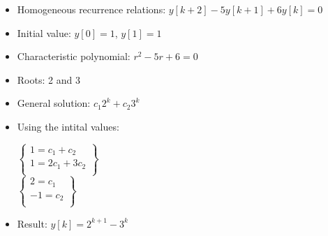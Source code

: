 \begin{frame}
	\begin{example}
		
		\begin{itemize}
			\item Homogeneous recurrence relations: $y[k+2]-5y[k+1]+6y[k] = 0$
			\item Initial value: $y[0] =1$, $y[1] = 1$
			\item Characteristic polynomial: $r^2-5r+6=0$
			\item Roots: 2 and 3
			\item General solution: $c_1 2^k + c_2 3^k$
			\item Using the intital values: 
			\begin{center}
				$
				\begin{Bmatrix}
					1 = c_1 + c_2\\
					1 = 2c_1 + 3c_2\\
				\end{Bmatrix}
				$\\
					$
					\begin{Bmatrix}
					2 = c_1 \\
					-1 = c_2\\
					\end{Bmatrix}
					$\\
			\end{center}
			\item Result: $y[k] = 2^{k+1} - 3^{k}$
		\end{itemize}
	\end{example}
\end{frame}
